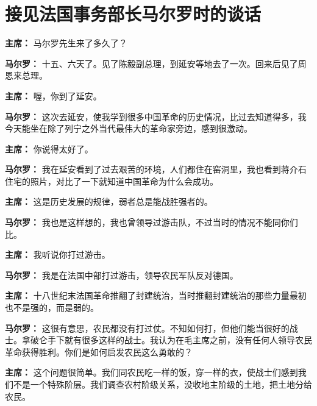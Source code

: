 \section[接见法国事务部长马尔罗时的谈话（一九六五年八月三日）]{接见法国事务部长马尔罗时的谈话}

\begin{duihua}

\item[\textbf{主席：}] 马尔罗先生来了多久了？

\item[\textbf{马尔罗：}] 十五、六天了。见了陈毅副总理，到延安等地去了一次。回来后见了周恩来总理。

\item[\textbf{主席：}] 喔，你到了延安。

\item[\textbf{马尔罗：}] 这次去延安，使我学到很多中国革命的历史情况，比过去知道得多，我今天能坐在除了列宁之外当代最伟大的革命家旁边，感到很激动。

\item[\textbf{主席：}] 你说得太好了。

\item[\textbf{马尔罗：}] 我在延安看到了过去艰苦的环境，人们都住在窑洞里，我也看到蒋介石住宅的照片，对比了一下就知道中国革命为什么会成功。

\item[\textbf{主席：}] 这是历史发展的规律，弱者总是能战胜强者的。

\item[\textbf{马尔罗：}] 我也是这样想的，我也曾领导过游击队，不过当时的情况不能同你们比。

\item[\textbf{主席：}] 我听说你打过游击。

\item[\textbf{马尔罗：}] 我是在法国中部打过游击，领导农民军队反对德国。

\item[\textbf{主席：}] 十八世纪末法国革命推翻了封建统治，当时推翻封建统治的那些力量最初也不是强的，而是弱的。

\item[\textbf{马尔罗：}] 这很有意思，农民都没有打过仗。不知如何打，但他们能当很好的战士。拿破仑手下就有很多这样的战士。我认为在毛主席之前，没有任何人领导农民革命获得胜利。你们是如何启发农民这么勇敢的？

\item[\textbf{主席：}] 这个问题很简单。我们同农民吃一样的饭，穿一样的衣，使战士们感到我们不是一个特殊阶层。我们调查农村阶级关系，没收地主阶级的土地，把土地分给农民。


\end{duihua}
